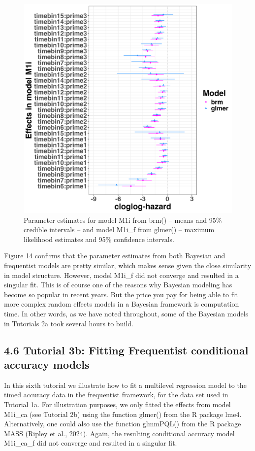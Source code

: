 \documentclass[
  man, donotrepeattitle,floatsintext]{apa6}
\begin{document}
\begin{figure}[H]

{\centering \includegraphics[width=0.8\linewidth,height=0.67\textheight,]{../Tutorial_3_Frequentist/comparison} 

}

\caption{Parameter estimates for model M1i from brm() -- means and 95\% credible intervals -- and model M1i\_f from glmer() -- maximum likelihood estimates and 95\% confidence intervals.}\label{fig:plot-comparison}
\end{figure}

Figure 14 confirms that the parameter estimates from both Bayesian and frequentist models are pretty similar, which makes sense given the close similarity in model structure. However, model M1i\_f did not converge and resulted in a singular fit. This is of course one of the reasons why Bayesian modeling has become so popular in recent years. But the price you pay for being able to fit more complex random effects models in a Bayesian framework is computation time. In other words, as we have noted throughout, some of the Bayesian models in Tutorials 2a took several hours to build.

\subsection{4.6 Tutorial 3b: Fitting Frequentist conditional accuracy models}\label{tutorial-3b-fitting-frequentist-conditional-accuracy-models}

In this sixth tutorial we illustrate how to fit a multilevel regression model to the timed accuracy data in the frequentist framework, for the data set used in Tutorial 1a. For illustration purposes, we only fitted the effects from model M1i\_ca (see Tutorial 2b) using the function glmer() from the R package lme4. Alternatively, one could also use the function glmmPQL() from the R package MASS (Ripley et al., 2024). Again, the resulting conditional accuracy model M1i\_ca\_f did not converge and resulted in a singular fit.
\end{document}
